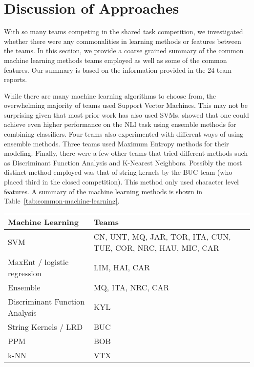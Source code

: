 \documentclass[11pt,letterpaper]{article}
\begin{document}
\section{Discussion of Approaches}
\label{sec-commonalities}
With so many teams competing in the shared task competition, we investigated
whether there were any commonalities in learning methods or features
between the teams.  In this section, we provide a coarse grained summary
of the common machine learning methods teams employed as well as some of
the common features.  Our summary is based on the information provided
in the 24 team reports.

While there are many machine learning algorithms to choose from, the overwhelming
majority of teams used Support Vector Machines.  This may not be surprising
given that most prior work has also used SVMs.
 showed that one could achieve even higher
performance on the NLI task using ensemble methods for combining classifiers.
Four teams also experimented with different ways of using ensemble methods.
Three teams used Maximum Entropy methods for their modeling.
Finally, there were a few other teams that tried different methods such as
Discriminant Function Analysis and K-Nearest Neighbors.  Possibly the most
distinct method employed was that of string kernels by the BUC team (who placed
third in the closed competition).  This method only used character level features.
A summary of the machine learning methods is shown in Table~\ref{tab:common-machine-learning}.


\begin{table*}[!ht]
\begin{center}
\begin{small}
\begin{tabular}{|l|p{10.5cm}|}
\hline
{\bf Machine Learning} & {\bf Teams} \\  \hline
SVM                    & CN, UNT, MQ, JAR, TOR, ITA, CUN, TUE, COR, NRC, HAU, MIC, CAR  \\ \hline
MaxEnt / logistic regression                 & LIM, HAI, CAR  \\ \hline
Ensemble               & MQ, ITA, NRC, CAR           \\ \hline
Discriminant Function Analysis & KYL \\ \hline
String Kernels / LRD   & BUC          \\ \hline
PPM                    & BOB \\ \hline
k-NN                   & VTX \\ \hline
\end{tabular}
\end{small}
\caption{Machine Learning algorithms used in Shared Task\label{tab:common-machine-learning}}
\end{center}
\end{table*}
\end{document}
